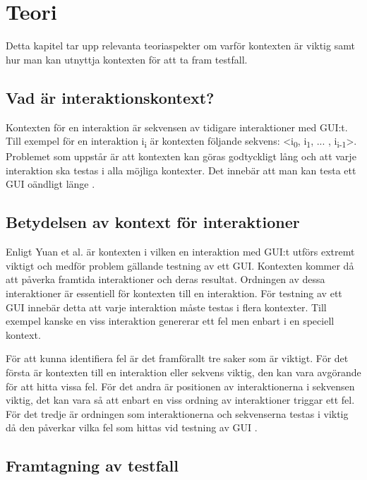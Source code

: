 \section{Teori}
\label{sec:theory-holmberg}

Detta kapitel tar upp relevanta teoriaspekter om varför kontexten är viktig samt hur man kan utnyttja kontexten för att ta fram testfall.

\subsection{Vad är interaktionskontext?}

Kontexten för en interaktion är sekvensen av tidigare interaktioner med GUI:t. Till exempel för en interaktion i\textsubscript{i} är kontexten följande sekvens: <i\textsubscript{0}, i\textsubscript{1},  ... , i\textsubscript{i-1}>. Problemet som uppstår är att kontexten kan göras godtyckligt lång och att varje interaktion ska testas i alla möjliga kontexter. Det innebär att man kan testa ett GUI oändligt länge \cite{yuan2011gui}. 

\subsection{Betydelsen av kontext för interaktioner}

Enligt Yuan et al. \cite{yuan2011gui} är kontexten i vilken en interaktion med GUI:t utförs extremt viktigt och medför problem gällande testning av ett GUI. Kontexten kommer då att påverka framtida interaktioner och deras resultat. Ordningen av dessa interaktioner är essentiell för kontexten till en interaktion. För testning av ett GUI innebär detta att varje interaktion måste testas i flera kontexter. Till exempel kanske en viss interaktion genererar ett fel men enbart i en speciell kontext.

För att kunna identifiera fel är det framförallt tre saker som är viktigt. För det första är kontexten till en interaktion eller sekvens viktig, den kan vara avgörande för att hitta vissa fel. För det andra är positionen av interaktionerna i sekvensen viktig, det kan vara så att enbart en viss ordning av interaktioner triggar ett fel. För det tredje är ordningen som interaktionerna och sekvenserna testas i viktig då den påverkar vilka fel som hittas vid testning av GUI \cite{yuan2011gui}.

\subsection{Framtagning av testfall}
\label{sec:testcase-holmberg}

